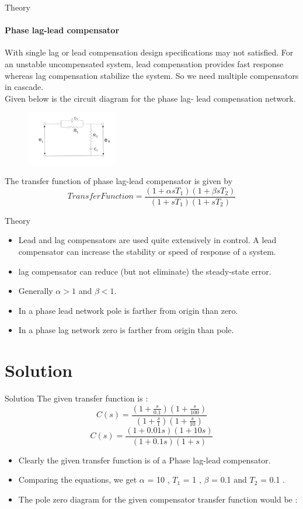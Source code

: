 \documentclass{beamer}
\begin{document}
\begin{frame}{Theory}
\framesubtitle{Phase lag-lead compensator}
With single lag or lead compensation design specifications may not satisfied. For an unstable uncompensated system, lead compensation provides fast response whereas lag compensation stabilize the system. So we need multiple compensators in cascade.
\\
Given below is the circuit diagram for the phase lag- lead compensation network.
\begin{figure}[h]
\centering
\includegraphics[width=4cm]{Screenshot (27).png}
\end{figure}
The transfer function of phase lag-lead compensator is given by
\[Transfer Function = \frac{(1+ \alpha s T_1)(1+\beta s T_2)}{(1+ s T_1)(1+s T_2)}\]
\end{frame}
\begin{frame}{Theory}
\begin{itemize}
\item Lead and lag compensators are used quite extensively in control. A lead compensator can increase the stability or speed of response of a system. 
\item lag compensator can reduce (but not eliminate) the steady-state error.
\item Generally $\alpha > 1$ and $\beta < 1$.
\item In a phase lead network pole is farther from origin than zero.
\item In a phase lag network zero is farther from origin than pole.
\end{itemize}

\end{frame}

\section{Solution}


\begin{frame}{Solution}
The given transfer function is :
\[C(s) = \frac{(1+\frac{s}{0.1})(1+\frac{s}{100})}{(1+\frac{s}{1})(1+\frac{s}{10})}\]
\[C(s) = \frac{(1+0.01 s)(1+10 s)}{(1+ 0.1 s)(1+ s)}\]
\begin{itemize}
\item Clearly the given transfer function is of a Phase lag-lead compensator.
\item Comparing the equations, we get $\alpha$ = 10 , $T_1$ = 1 , $\beta$ = 0.1 and   $T_2$ = 0.1 .

\item The pole zero diagram for the given compensator transfer function would be :
\end{itemize}
\end{frame}
\end{document}
